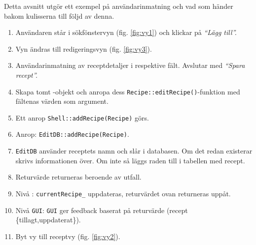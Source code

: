 Detta avsnitt utgör ett exempel på användarinmatning och vad som händer bakom kulisserna till följd av denna.

\begin{enumerate}
  \item Användaren står i sökfönstervyn (fig. \ref{fig:vy1}) och klickar på \emph{``Lägg till''.}
  \item Vyn ändras till redigeringsvyn (fig. \ref{fig:vy3}). 
  \item Användarinmatning av receptdetaljer i respektive fält. Avslutar med \emph{``Spara recept''.}
  \item Skapa tomt \Recipe-objekt och anropa dess \verb=Recipe::editRecipe()=-funktion med fältenas värden som argument.
  \item Ett anrop \verb=Shell::addRecipe(Recipe)= görs.
  \item Anrop: \verb=EditDB::addRecipe(Recipe)=.
  \item \verb=EditDB= använder receptets namn och slår i databasen. Om det redan existerar skrivs informationen över. Om inte så läggs raden till i tabellen med recept.
  \item Returvärde returneras beroende av utfall.
  \item Nivå \Shell: \verb=currentRecipe_= uppdateras, returvärdet ovan returneras uppåt.
  \item Nivå \verb=GUI=: \verb=GUI= ger feedback baserat på returvärde (recept \{tillagt,uppdaterat\}).
\item Byt vy till receptvy (fig. \ref{fig:vy2}).
\end{enumerate}


